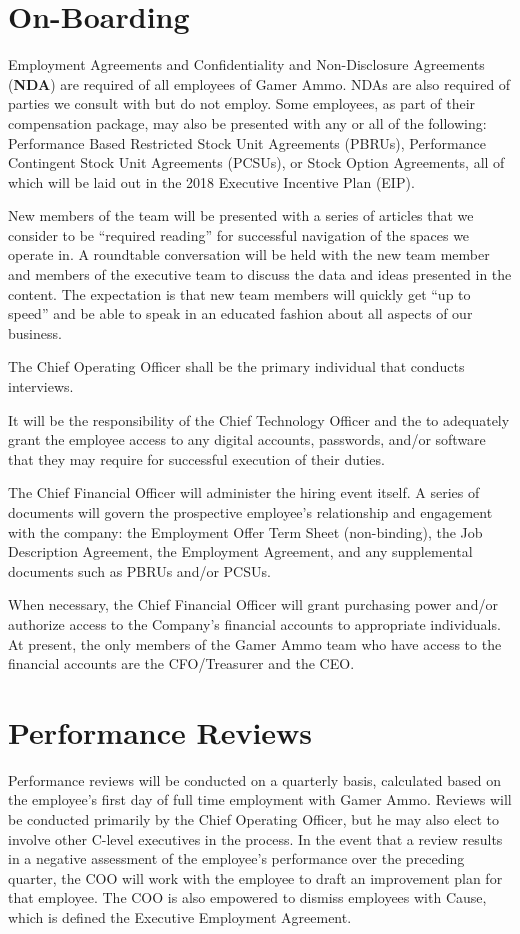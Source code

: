 \documentclass[11pt]{report}
\begin{document}
\section{On-Boarding}
Employment Agreements and Confidentiality and Non-Disclosure Agreements (\textbf{NDA}) are required of all employees of Gamer Ammo. NDAs are also required of parties we consult with but do not employ. Some employees, as part of their compensation package, may also be presented with any or all of the following: Performance Based Restricted Stock Unit Agreements (PBRUs), Performance Contingent Stock Unit Agreements (PCSUs), or Stock Option Agreements, all of which will be laid out in the 2018 Executive Incentive Plan (EIP).

New members of the team will be presented with a series of articles that we consider to be ``required reading''\cite{crypto-canon} for successful navigation of the spaces we operate in. A roundtable conversation will be held with the new team member and members of the executive team to discuss the data and ideas presented in the content. The expectation is that new team members will quickly get ``up to speed'' and be able to speak in an educated fashion about all aspects of our business.

The Chief Operating Officer shall be the primary individual that conducts interviews.

It will be the responsibility of the Chief Technology Officer and the to adequately grant the employee access to any digital accounts, passwords, and/or software that they may require for successful execution of their duties.

The Chief Financial Officer will administer the hiring event itself. A series of documents will govern the prospective employee's relationship and engagement with the company: the Employment Offer Term Sheet (non-binding), the Job Description Agreement, the Employment Agreement, and any supplemental documents such as PBRUs and/or PCSUs.

When necessary, the Chief Financial Officer will grant purchasing power and/or authorize access to the Company's financial accounts to appropriate individuals. At present, the only members of the Gamer Ammo team who have access to the financial accounts are the CFO/Treasurer and the CEO.
\section{Performance Reviews}
Performance reviews will be conducted on a quarterly basis, calculated based on the employee's first day of full time employment with Gamer Ammo. Reviews will be conducted primarily by the Chief Operating Officer, but he may also elect to involve other C-level executives in the process. In the event that a review results in a negative assessment of the employee's performance over the preceding quarter, the COO will work with the employee to draft an improvement plan for that employee. The COO is also empowered to dismiss employees with Cause, which is defined the Executive Employment Agreement.
\end{document}
